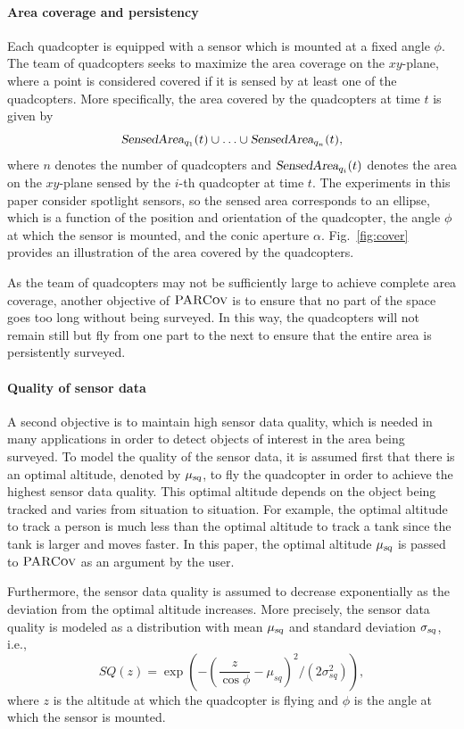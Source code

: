 \documentclass[letterpaper, 10pt, conference]{ieeeconf}
\newcommand{\Function}[1]{\ensuremath{{ \textsc{#1}}}}
\newcommand{\Var}[1]{\ensuremath{{{\textsl{#1}}}}}
\newcommand{\Name}{\Function{\small{PARCov}}}
\begin{document}
\paragraph{Area coverage and persistency}
\label{sec:Coverage}  Each quadcopter is
equipped with a sensor which is mounted at a fixed angle $\phi$.  The
team of quadcopters seeks to maximize the area coverage on the
$xy$-plane, where a point is considered covered if it is sensed by at
least one of the quadcopters. More specifically,
the area covered by the quadcopters at time $t$ is given by
$$
\Var{SensedArea}_{q_1}(t) \cup \ldots \cup \Var{SensedArea}_{q_n}(t),
$$ where $n$ denotes the number of quadcopters and
$\Var{SensedArea}_{q_i}(t)$ denotes the area on the $xy$-plane sensed
by the $i$-th quadcopter at time $t$.  The experiments
in this paper consider spotlight sensors, so the sensed area
corresponds to an ellipse, which is a function of the
position and orientation of the quadcopter, the angle $\phi$ at which
the sensor is mounted, and the conic aperture $\alpha$.
Fig.~\ref{fig:cover} provides an illustration of the area covered by
the quadcopters.

As the team of quadcopters may not be sufficiently large to achieve
complete area coverage, another objective of $\Name$ is
to ensure that no part of the space goes too long without being
surveyed. In this way, the quadcopters will not remain still but fly
from one part to the next to ensure that the entire area is
persistently surveyed.

\paragraph{Quality of sensor data}
\label{sec:SQ} A second objective is to maintain high sensor data quality, which is needed
in many applications in order to detect objects of interest in the
area being surveyed.  To model the quality of the sensor data, it is
assumed first that there is an optimal altitude, denoted by
$\mu_\Var{sq}$, to fly the quadcopter in order to achieve the highest
sensor data quality. This optimal altitude depends on the object being
tracked and varies from situation to situation. For example, the
optimal altitude to track a person is much less than the optimal altitude
to track a tank since the tank is larger and moves faster.  In this
paper, the optimal altitude $\mu_\Var{sq}$ is passed to $\Name$ as an
argument by the user.

Furthermore, the sensor data quality is assumed to decrease exponentially
as the deviation from the optimal altitude increases. More precisely,
the sensor data quality is modeled as a distribution with mean
$\mu_\Var{sq}$ and standard deviation $\sigma_\Var{sq}$, i.e.,
$$ SQ(z) = \exp{(-{(\frac{z}{ \cos{\phi}} -
\mu_{sq})^2}/{(2\sigma_{sq}^2)})},
$$
where $z$ is the altitude at which the quadcopter is flying and $\phi$
is the angle at which the sensor is mounted.
\end{document}

